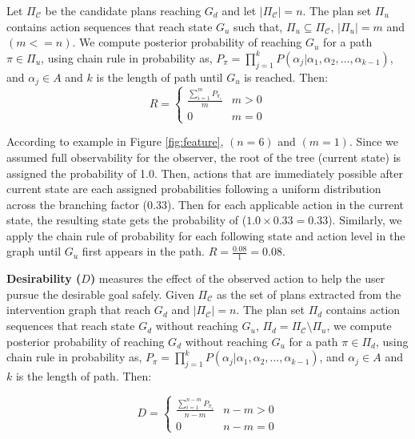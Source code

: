 Let $\Pi_{\mathcal{C}}$ be the candidate plans reaching $G_d$ and let $\left | \Pi_{\mathcal{C}} \right |=n$. The plan set $\Pi_{u}$ contains action sequences that reach state $G_u$ such that, $\Pi_{u} \subseteq \Pi_{\mathcal{C}}$, $\left | \Pi_{u} \right |=m$ and $(m<=n)$. We compute posterior probability of reaching $G_u$ for a path $\pi \in \Pi_{u}$, using chain rule in probability as, $P_{\pi}=\prod_{j=1}^{k}P(\alpha_j|\alpha_1, \alpha_2,...,\alpha_{k-1})$, and $\alpha_{j} \in A$ and $k$ is the length of path until $G_u$ is reached. Then: 
\begin{equation*} 
R = \left\{\begin{matrix} \frac{\sum_{i=1}^{m}P_{\pi_i}}{m} & m>0\\ 0 &  m=0 \end{matrix}\right.
\end{equation*}

According to example in Figure \ref{fig:feature}, $(n=6)$ and $(m=1)$. Since we assumed full observability for the observer, the root of the tree (current state) is assigned the probability of 1.0. Then, actions that are immediately possible after current state are each assigned probabilities following a uniform distribution across the branching factor (0.33). Then for each applicable action in the current state, the resulting state gets the probability of ($1.0\times0.33=0.33$). Similarly, we apply the chain rule of probability for each following state and action level in the graph until $G_u$ first appears in the path. $R=\frac{0.08}{1}=0.08$.


\textbf{Desirability ($D$)} measures the effect of the observed action to help the user pursue the desirable goal safely. Given $\Pi_{\mathcal{C}}$ as the set of plans extracted from the intervention graph that reach $G_d$ and $\left | \Pi_{\mathcal{C}} \right |=n$. The plan set $\Pi_{d}$ contains action sequences that reach state $G_d$ without reaching $G_u$, $\Pi_{d} = \Pi_{\mathcal{C}} \setminus \Pi_{u} $, we compute  posterior probability of reaching $G_d$ without reaching $G_u$ for a path $\pi \in \Pi_{d}$, using chain rule in probability as, $P_{\pi}=\prod_{j=1}^{k}P(\alpha_j|\alpha_1, \alpha_2,...,\alpha_{k-1})$, and $\alpha_{j} \in A$ and $k$ is the length of path. Then:

\begin{equation*} 
D = \left\{\begin{matrix}
\frac{\sum_{i=1}^{n-m}P_{\pi_i}}{n-m} & n-m>0\\ 
0 &  n-m=0
\end{matrix}\right.
\end{equation*} 

